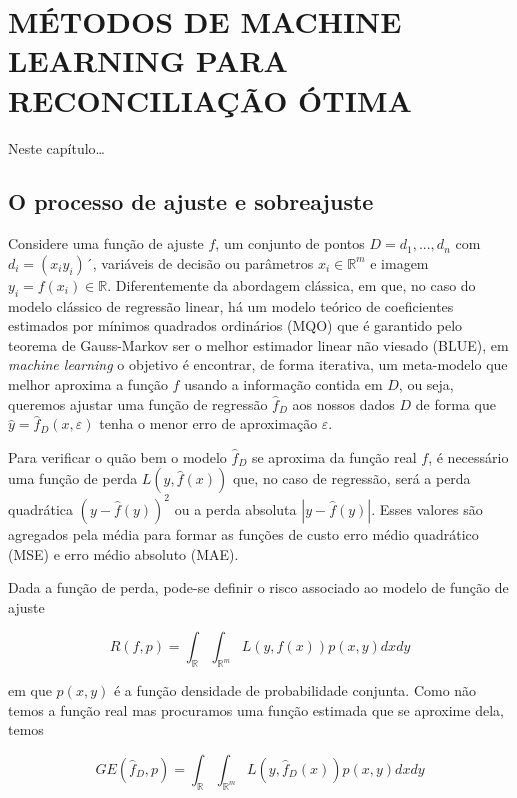 \documentclass[
  12pt,
  oneside,
  a4paper,
  chapter=TITLE,
  section=TITLE,
  brazil]{abntex2}
\begin{document}
\hypertarget{muxe9todos-de-machine-learning-para-reconciliauxe7uxe3o-uxf3tima}{%
\section{MÉTODOS DE MACHINE LEARNING PARA RECONCILIAÇÃO
ÓTIMA}\label{muxe9todos-de-machine-learning-para-reconciliauxe7uxe3o-uxf3tima}}

Neste capítulo\ldots{}

\hypertarget{o-processo-de-ajuste-e-sobreajuste}{%
\subsection{O processo de ajuste e
sobreajuste}\label{o-processo-de-ajuste-e-sobreajuste}}

Considere uma função de ajuste \(f\), um conjunto de pontos
\(D = {d_1, ..., d_n}\) com \(d_i = (x_i y_i)´\), variáveis de decisão
ou parâmetros \(x_i \in \mathbb{R}^m\) e imagem
\(y_i = f(x_i) \in \mathbb{R}\). Diferentemente da abordagem clássica,
em que, no caso do modelo clássico de regressão linear, há um modelo
teórico de coeficientes estimados por mínimos quadrados ordinários (MQO)
que é garantido pelo teorema de Gauss-Markov ser o melhor estimador
linear não viesado (BLUE), em \emph{machine learning} o objetivo é
encontrar, de forma iterativa, um meta-modelo que melhor aproxima a
função \(f\) usando a informação contida em \(D\), ou seja, queremos
ajustar uma função de regressão \(\hat{f}_D\) aos nossos dados \(D\) de
forma que \(\hat{y} = \hat{f}_D(x, \varepsilon)\) tenha o menor erro de
aproximação \(\varepsilon\).

Para verificar o quão bem o modelo \(\hat{f}_D\) se aproxima da função
real \(f\), é necessário uma função de perda \(L(y, \hat{f}(x))\) que,
no caso de regressão, será a perda quadrática \((y - \hat{f}(y))^2\) ou
a perda absoluta \(|y - \hat{f}(y)|\). Esses valores são agregados pela
média para formar as funções de custo erro médio quadrático (MSE) e erro
médio absoluto (MAE).

Dada a função de perda, pode-se definir o risco associado ao modelo de
função de ajuste

\[R(f, p) = \int_{\mathbb{R}}{}\int_{\mathbb{R}^m}{} L(y, f(x))p(x, y)dxdy\]

em que \(p(x, y)\) é a função densidade de probabilidade conjunta. Como
não temos a função real mas procuramos uma função estimada que se
aproxime dela, temos

\[GE(\hat{f}_D, p) = \int_{\mathbb{R}}{}\int_{\mathbb{R}^m}{} L(y, \hat{f}_D(x))p(x, y)dxdy \tag{1}\]
\end{document}
